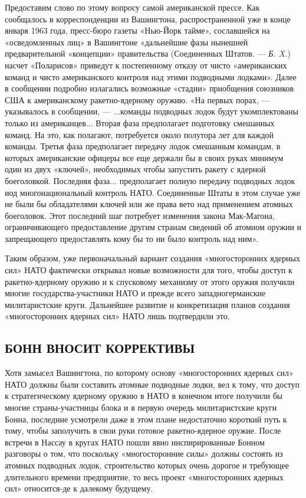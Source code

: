 \documentclass[12pt, a4paper, openany]{book}
\begin{document}
Предоставим слово по этому вопросу самой американской прессе. Как сообщалось в корреспонденции из Вашингтона, распространенной уже в конце января 1963 года, пресс-бюро газеты «Нью-Йорк тайме», сославшейся на «осведомленных лиц» в Вашингтоне «дальнейшие фазы нынешней предварительной «концепции» правительства (Соединенных Штатов. — \textit{Б. X.}) насчет «Поларисов» приведут к постепенному отказу от чисто «американских команд и чисто американского контроля над этими подводными лодками». Далее в сообщении подробно излагались возможные «стадии» приобщения союзников США к американскому ракетно-ядерному оружию. «На первых порах, — указывалось в сообщении, — ...команды подводных лодок будут укомплектованы только из американцев... Вторая фаза предполагает подготовку смешанных команд. На это, как полагают, потребуется около полутора лет для каждой команды. Третья фаза предполагает передачу лодок смешанным командам, в которых американские офицеры все еще держали бы в своих руках минимум один из двух «ключей», необходимых чтобы запустить ракету с ядерной боеголовкой. Последняя фаза... предполагает полную передачу подводных лодок иод многонациональный контроль НАТО. Соединенные Штаты в этом случае уже не были бы обладателями ключей или же права вето над применением атомных боеголовок. Этот последний шаг потребует изменения закона Мак-Магона, ограничивающего предоставление другим странам сведений об атомном оружии и запрещающего предоставлять кому бы то ни было контроль над ним».

Таким образом, уже первоначальный вариант создания «многосторонних ядерных сил» НАТО фактически открывал новые возможности для того, чтобы доступ к ракетно-ядерному оружию и к спусковому механизму от этого оружия получили многие государства-участники НАТО и прежде всего западногерманские милитаристские круги. Дальнейшее развитие и конкретизация планов создания «многосторонних ядерных сил» НАТО лишь подтвердили это.

	\subsection[Бонн вносит коррективы]{\center БОНН ВНОСИТ КОРРЕКТИВЫ}


Хотя замысел Вашингтона, по которому основу «многосторонних ядерных сил» НАТО должны были составить атомные подводные лодки, вел к тому, что доступ к стратегическому ядерному оружию в НАТО в конечном итоге получили бы многие страны-участницы блока и в первую очередь милитаристские круги Бонна, последние усмотрели даже в этом плане недостаточно короткий путь к тому, чтобы заполучить в свои руки готовое ракетно-ядерное оружие. После встречи в Нассау в кругах НАТО пошли явно инспирированные Бонном разговоры о том, что поскольку «многосторонние силы» должны состоять из атомных подводных лодок, строительство которых очень дорогое и требующее длительного времени предприятие, то весь проект «многосторонних ядерных сил» относится-де к далекому будущему.
\end{document}
